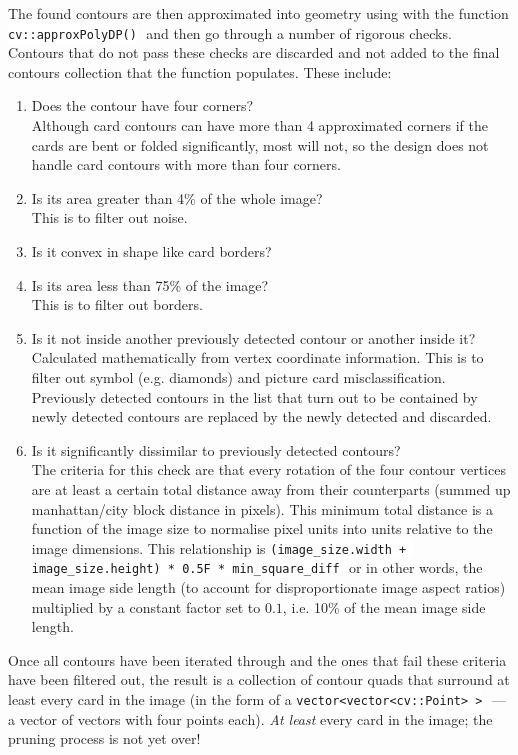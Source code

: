\documentclass[a4paper,12pt,notitlepage]{article}
\newcommand{\code}[1]{\colorbox{white}{\lstinline[basicstyle=\ttfamily\color{black}]|#1|} }
\begin{document}
			The found contours are then approximated into geometry using with the function \code{cv::approxPolyDP()} and then go through a number of rigorous checks. Contours that do not pass these checks are discarded and not added to the final contours collection that the function populates. These include:

			\begin{enumerate}
				\item Does the contour have four corners?\\[4px]
					Although card contours can have more than 4 approximated corners if the cards are bent or folded significantly, most will not, so the design does not handle card contours with more than four corners.
				\item Is its area greater than 4\% of the whole image?\\[4px]
					This is to filter out noise.
				\item Is it convex in shape like card borders?
				\item Is its area less than 75\% of the image?\\[4px]
					This is to filter out borders.
				\item Is it not inside another previously detected contour or another inside it?\\[4px]
					Calculated mathematically from vertex coordinate information. This is to filter out symbol (e.g. diamonds) and picture card misclassification. Previously detected contours in the list that turn out to be contained by newly detected contours are replaced by the newly detected and discarded.
				\item Is it significantly dissimilar to previously detected contours?\\[4px]
					The criteria for this check are that every rotation of the four contour vertices are at least a certain total distance away from their counterparts (summed up manhattan/city block distance in pixels). This minimum total distance is a function of the image size to normalise pixel units into units relative to the image dimensions. This relationship is \code{(image_size.width + image_size.height) * 0.5F * min_square_diff} or in other words, the mean image side length (to account for disproportionate image aspect ratios) multiplied by a constant factor set to $0.1$, i.e. 10\% of the mean image side length.
			\end{enumerate}

			Once all contours have been iterated through and the ones that fail these criteria have been filtered out, the result is a collection of contour quads that surround at least every card in the image (in the form of a \code{vector<vector<cv::Point> >} --- a vector of vectors with four points each). \emph{At least} every card in the image; the pruning process is not yet over!
\end{document}
